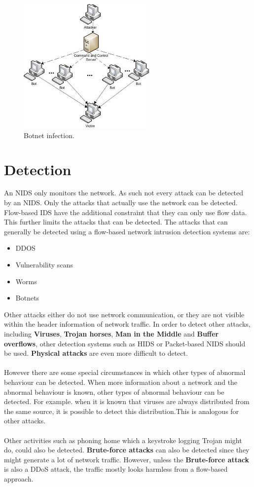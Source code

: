 \begin{figure}[H]
\centering
\includegraphics[width=0.6\textwidth]{Figures/botnet}
\decoRule
\caption[Botnet infection]{Botnet infection. \cite{botnetExample}}
\label{fig:botnet}
\end{figure}

\section{Detection}
An NIDS only monitors the network. As such not every attack can be detected by an NIDS. Only the attacks that actually use the network can be detected. Flow-based IDS have the additional constraint that they can only use flow data. This further limits the attacks that can be detected. The attacks that can generally be detected using a flow-based network intrusion detection systems are:
\begin{itemize}
\item DDOS
\item Vulnerability scans
\item Worms
\item Botnets
\end{itemize}
Other attacks either do not use network communication, or they are not visible within the header information of network traffic. In order to detect other attacks, including \textbf{Viruses}, \textbf{Trojan horses}, \textbf{Man in the Middle} and \textbf{Buffer overflows}, other detection systems such as HIDS or Packet-based NIDS should be used. \textbf{Physical attacks} are even more difficult to detect. \\\\
However there are some special circumstances in which other types of abnormal behaviour can be detected. When more information about a network and the abnormal behaviour is known, other types of abnormal behaviour can be detected. For example. when it is known that viruses are always distributed from the same source, it is possible to detect this distribution.This is  analogous for other attacks. \\\\
Other activities such as phoning home which a keystroke logging Trojan might do, could also be detected.  \textbf{Brute-force attacks} can also be detected since they might generate a lot of network traffic. However, unless the \textbf{Brute-force attack} is also a DDoS attack, the traffic mostly looks harmless from a flow-based approach. \cite{paulauskas2015computer}


